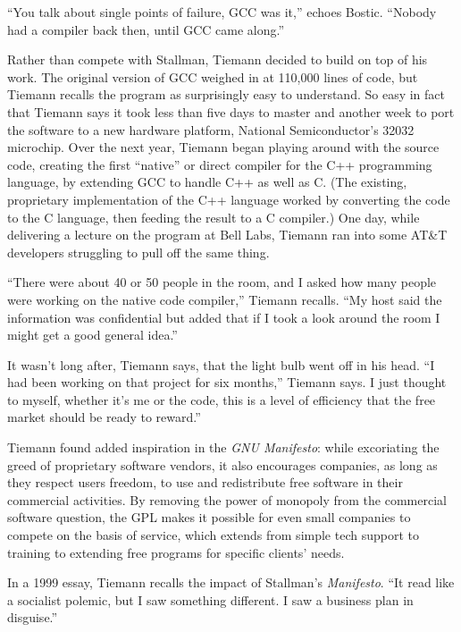 ``You talk about single points of failure, GCC was it,'' echoes Bostic. ``Nobody had a compiler back then, until GCC came along.''

Rather than compete with Stallman, Tiemann decided to build on top of his work. The original version of GCC weighed in at 110,000 lines of code, but Tiemann recalls the program as surprisingly easy to understand. So easy in fact that Tiemann says it took less than five days to master and another week to port the software to a new hardware platform, National Semiconductor's 32032 microchip. Over the next year, Tiemann began playing around with the source code, creating the first ``native'' or direct compiler for the C++ programming language, by extending GCC to handle C++ as well as C. (The existing, proprietary implementation of the C++ language worked by converting the code to the C language, then feeding the result to a C compiler.) One day, while delivering a lecture on the program at Bell Labs, Tiemann ran into some AT\&T developers struggling to pull off the same thing.

``There were about 40 or 50 people in the room, and I asked how many people were working on the native code compiler,'' Tiemann recalls. ``My host said the information was confidential but added that if I took a look around the room I might get a good general idea.''

It wasn't long after, Tiemann says, that the light bulb went off in his head. ``I had been working on that project for six months,'' Tiemann says. I just thought to myself, whether it's me or the code, this is a level of efficiency that the free market should be ready to reward.''

Tiemann found added inspiration in the \textit{GNU Manifesto}: while excoriating the greed of proprietary software vendors, it also encourages companies, as long as they respect users freedom, to use and redistribute free software in their commercial activities. By removing the power of monopoly from the commercial software question, the GPL makes it possible for even small companies to compete on the basis of service, which extends from simple tech support to training to extending free programs for specific clients' needs.

In a 1999 essay, Tiemann recalls the impact of Stallman's \textit{Manifesto}. ``It read like a socialist polemic, but I saw something different. I saw a business plan in disguise.''

